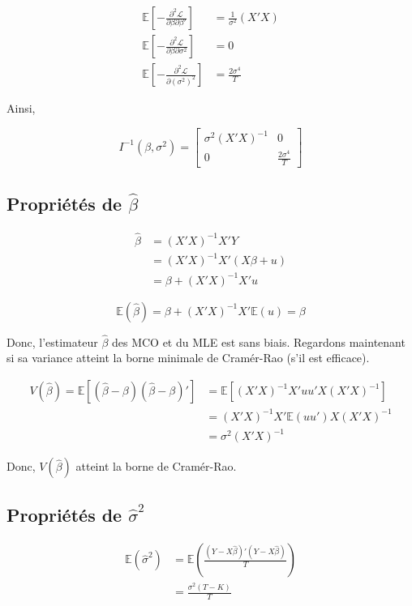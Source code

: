 \documentclass[14pt]{extarticle} %
\begin{document}
\begin{align*}
\mathbb{E} \left[ -\frac{\partial^2 \mathcal{L}}{\partial \beta \partial \beta'} \right] &= \frac{1}{\sigma^2} (X'X) \\
\mathbb{E} \left[ -\frac{\partial^2 \mathcal{L}}{\partial \beta \partial \sigma^2} \right] &= 0 \\
\mathbb{E} \left[ -\frac{\partial^2 \mathcal{L}}{\partial (\sigma^2)^2} \right] &= \frac{2\sigma^4}{T}
\end{align*}

Ainsi,

\[
I^{-1}(\beta, \sigma^2) = \begin{bmatrix}
\sigma^2 (X'X)^{-1} & 0 \\
0 & \frac{2\sigma^4}{T}
\end{bmatrix}
\]

\subsection{Propriétés de \(\hat{\beta}\)}

\begin{align*}
\hat{\beta} &= (X'X)^{-1}X'Y \\
&= (X'X)^{-1}X'(X\beta + u) \\
&= \beta + (X'X)^{-1}X'u
\end{align*}

\[
\mathbb{E}(\hat{\beta}) = \beta + (X'X)^{-1}X'\mathbb{E}(u) = \beta
\]

Donc, l’estimateur \(\hat{\beta}\) des MCO et du MLE est sans biais. Regardons maintenant si sa variance atteint la borne minimale de Cramér-Rao (s’il est efficace).

\begin{align*}
V(\hat{\beta}) = \mathbb{E}[(\hat{\beta} - \beta)(\hat{\beta} - \beta)']  & = \mathbb{E}[(X'X)^{-1}X'u u'X(X'X)^{-1}] \\
& = (X'X)^{-1}X'\mathbb{E}(u u')X(X'X)^{-1} \\
& = \sigma^2 (X'X)^{-1}
\end{align*}

Donc, \(V(\hat{\beta})\) atteint la borne de Cramér-Rao.

\subsection{Propriétés de \(\hat{\sigma}^2\)}

\begin{align*}
\mathbb{E}(\hat{\sigma}^2) &= \mathbb{E}\left( \frac{(Y - X\hat{\beta})'(Y - X\hat{\beta})}{T} \right) \\
&= \frac{\sigma^2 (T - K)}{T}
\end{align*}
\end{document}
